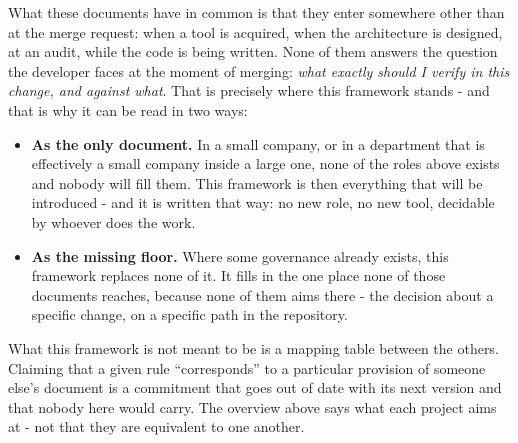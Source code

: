 \medskip
\noindent
What these documents have in common is that they enter somewhere other than at the merge request: when a tool is acquired, when the architecture is designed, at an audit, while the code is being written.
None of them answers the question the developer faces at the moment of merging: \emph{what exactly should I verify in this change, and against what}.
That is precisely where this framework stands - and that is why it can be read in two ways:

\begin{itemize}
\item \textbf{As the only document.}
In a small company, or in a department that is effectively a small company inside a large one, none of the roles above exists and nobody will fill them.
This framework is then everything that will be introduced - and it is written that way: no new role, no new tool, decidable by whoever does the work.
\item \textbf{As the missing floor.}
Where some governance already exists, this framework replaces none of it.
It fills in the one place none of those documents reaches, because none of them aims there - the decision about a specific change, on a specific path in the repository.
\end{itemize}

What this framework is not meant to be is a mapping table between the others.
Claiming that a given rule \enquote{corresponds} to a particular provision of someone else's document is a commitment that goes out of date with its next version and that nobody here would carry.
The overview above says what each project aims at - not that they are equivalent to one another.


